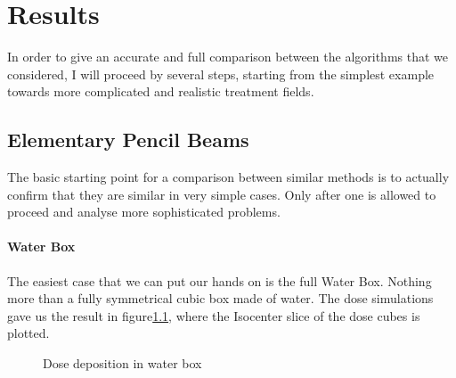 \documentclass[12pt, a4paper, twoside]{book}
\begin{document}
\chapter{Results} %




In order to give an accurate and full comparison between the algorithms that we considered, I will proceed by several steps, starting from the simplest example towards more complicated and realistic treatment fields.




\section{Elementary Pencil Beams}
The basic starting point for a comparison between similar methods is to actually confirm that they are similar in very simple cases. Only after one is allowed to proceed and analyse more sophisticated problems. 

\subsubsection{Water Box}
The easiest case that we can put our hands on is the full Water Box. Nothing more than a fully symmetrical cubic box made of water.
The dose simulations gave us the result in figure\ref{fig:WB1}, where the Isocenter slice of the dose cubes is plotted.
\begin{figure}[!ht]
\centering
{}
\caption{Dose deposition in water box}
\label{fig:WB1}
\end{figure}
\end{document}
